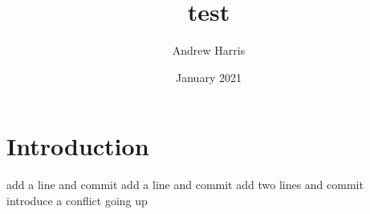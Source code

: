 \documentclass{article}
\title{test}
\author{Andrew Harris}
\date{January 2021}
\begin{document}
\maketitle

\section{Introduction}
add a line and commit
add a line and commit
add two lines and commit
introduce a conflict going up
\end{document}
